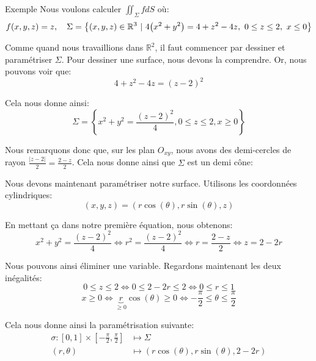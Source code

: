 \documentclass[a4paper]{article}
\begin{document}
\begin{parag}{Exemple}
    Nous voulons calculer $\iint_{\Sigma} f dS$ où: 
    \[f\left(x, y, z\right) = z, \mathspace \Sigma = \left\{\left(x, y, z\right) \in \mathbb{R}^3\ |\ 4\left(x^2 + y^2\right) = 4 + z^2 - 4z,\ 0 \leq z \leq 2,\ x \leq 0\right\}\]
    

    Comme quand nous travaillions dans $\mathbb{R}^2$, il faut commencer par dessiner et paramétriser $\Sigma$. Pour dessiner une surface, nous devons la comprendre. Or, nous pouvons voir que: 
    \[4 + z^2 - 4z = \left(z - 2\right)^2\]

    Cela nous donne ainsi: 
    \[\Sigma = \left\{x^2 + y^2 = \frac{\left(z - 2\right)^2}{4}, 0 \leq z \leq 2, x \geq 0\right\}\]
    
    Nous remarquons donc que, sur les plan $O_{xy}$, nous avons des demi-cercles de rayon $\frac{\left|z - 2\right|}{2} = \frac{2 - z}{2}$. Cela nous donne ainsi que $\Sigma$ est un demi cône:

    Nous devons maintenant paramétriser notre surface. Utilisons les coordonnées cylindriques: 
    \[\left(x, y, z\right) = \left(r\cos\left(\theta\right), r\sin\left(\theta\right), z\right)\]
    
    En mettant ça dans notre première équation, nous obtenons: 
    \[x^2 + y^2= \frac{\left(z-2\right)^2}{4} \iff r^2 = \frac{\left(z-2\right)^2}{4} \iff r = \frac{2 - z}{2} \iff z = 2 - 2r\]
    
    Nous pouvons ainsi éliminer une variable. Regardons maintenant les deux inégalités: 
    \[0 \leq z \leq 2 \iff 0 \leq 2 - 2r \leq 2 \iff 0 \leq r \leq 1\]
    \[x \geq 0 \iff \underbrace{r}_{\geq 0}\cos\left(\theta\right) \geq 0 \iff -\frac{\pi}{2} \leq \theta \leq \frac{\pi}{2}\]

    Cela nous donne ainsi la paramétrisation suivante:
    \[\begin{split}
    \sigma: \left[0, 1\right] \times \left[-\frac{\pi}{2}, \frac{\pi}{2}\right] &\longmapsto \Sigma\\
    \left(r, \theta\right) &\longmapsto \left(r\cos\left(\theta\right), r\sin\left(\theta\right), 2 - 2r\right)
    \end{split}\]
    

\end{parag}
\end{document}
